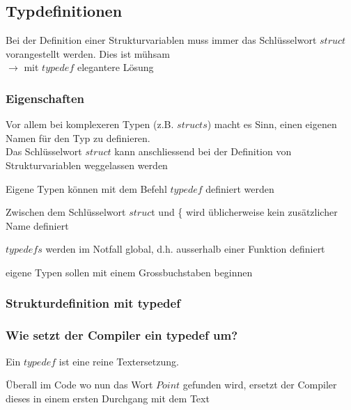 	\subsection{Typdefinitionen}
		Bei der Definition einer Strukturvariablen muss immer das Schlüsselwort $struct$ vorangestellt werden. Dies ist mühsam\\ $\rightarrow$ mit $typedef$ elegantere Lösung
		\subsubsection{Eigenschaften}
			\begin{compactitem}
				\item Vor allem bei komplexeren Typen (z.B. $structs$) macht es Sinn, einen eigenen Namen für den Typ zu definieren.\\ Das Schlüsselwort $struct$ kann anschliessend bei der Definition von Strukturvariablen weggelassen werden
				\item Eigene Typen können mit dem Befehl $typedef$ definiert werden
				\item Zwischen dem Schlüsselwort $struc$t und \{ wird üblicherweise kein zusätzlicher Name definiert
				\item $typedefs$ werden im Notfall global, d.h. ausserhalb einer Funktion definiert
				\item eigene Typen sollen mit einem Grossbuchstaben beginnen 
			\end{compactitem} 
			
\newpage%

	\begin{minipage}[t]{14 cm}
		\subsubsection{Strukturdefinition mit typedef}
			
	\end{minipage}
	\begin{minipage}[t]{4.5 cm}
		\subsubsection{Wie setzt der Compiler ein typedef um?}
			Ein $typedef$ ist eine reine Textersetzung. 
			
			Überall im Code wo nun das Wort $Point$ gefunden wird, ersetzt der Compiler dieses in einem ersten Durchgang mit dem Text
			 
	\end{minipage}